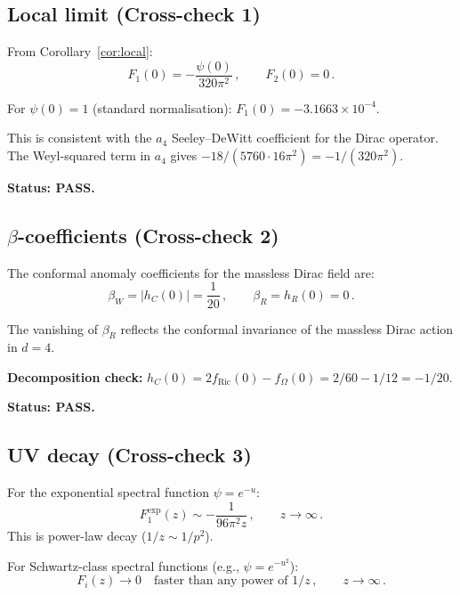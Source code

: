 \documentclass[11pt,a4paper]{article}
\newcommand{\eg}{e.g.}
\theoremstyle{definition}
\theoremstyle{remark}
\begin{document}
\subsection{Local limit (Cross-check 1)}

From Corollary~\ref{cor:local}:
\begin{equation}
  F_1(0) = -\frac{\psi(0)}{320\pi^2}\,,\qquad
  F_2(0) = 0\,.
\end{equation}

For $\psi(0) = 1$ (standard normalisation):
$F_1(0) = -3.1663 \times 10^{-4}$.

This is consistent with the $a_4$ Seeley--DeWitt coefficient
for the Dirac operator.  The Weyl-squared term in $a_4$
gives $-18/(5760 \cdot 16\pi^2) = -1/(320\pi^2)$.

\textbf{Status: PASS.}


\subsection{$\beta$-coefficients (Cross-check 2)}

The conformal anomaly coefficients for the massless Dirac field are:
\begin{equation}
  \beta_W = |h_C(0)| = \frac{1}{20}\,,\qquad
  \beta_R = h_R(0) = 0\,.
  \label{eq:beta-check}
\end{equation}

The vanishing of $\beta_R$ reflects the conformal invariance of the
massless Dirac action in $d = 4$.

\textbf{Decomposition check:}
$h_C(0) = 2f_{\text{Ric}}(0) - f_\Omega(0) = 2/60 - 1/12 = -1/20$. \checkmark

\textbf{Status: PASS.}


\subsection{UV decay (Cross-check 3)}

For the exponential spectral function $\psi = e^{-u}$:
\begin{equation}
  F_1^{\exp}(z) \sim -\frac{1}{96\pi^2 z}\,,\qquad
  z \to \infty\,.
  \label{eq:UV-exp}
\end{equation}
This is power-law decay ($1/z \sim 1/p^2$).

For Schwartz-class spectral functions (\eg, $\psi = e^{-u^2}$):
\begin{equation}
  F_i(z) \to 0 \quad\text{faster than any power of $1/z$}\,,
  \qquad z \to \infty\,.
  \label{eq:UV-schwartz}
\end{equation}
\end{document}
